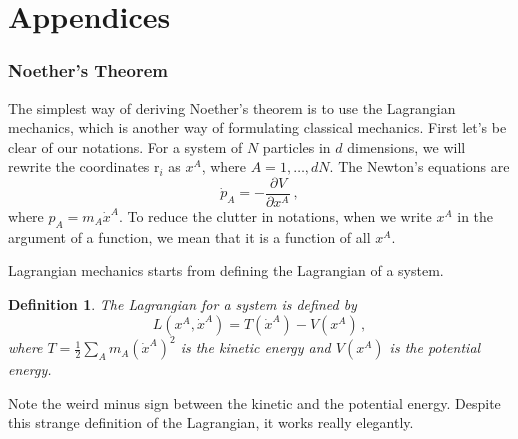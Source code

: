 \documentclass{article}
\theoremstyle{plain}\theoremheaderfont{\normalfont\itshape}\theorembodyfont{\rmfamily}\theoremseparator{.}\newtheorem*{rem}{Remark}\newtheorem*{ex}{Example}\newtheorem*{proof}{Proof}\newtheorem*{altp}{Alternative proof}
\theoremstyle{plain}\theoremheaderfont{\normalfont\bfseries}\theorembodyfont{\rmfamily}\theoremseparator{.}\newtheorem{thm}{Theorem}[section]\newtheorem{lem}[thm]{Lemma}\newtheorem{prop}[thm]{Proposition}\newtheorem*{cor}{Corollary}\newtheorem{defn}[thm]{Definition}\newtheorem{clm}[thm]{Claim}\newtheorem{clminproof}{Claim}\newtheorem{alg}[thm]{Algorithm}\newtheorem{hyp}[thm]{Hypothesis}\newtheorem{law}[thm]{Law}
\theoremstyle{break}\theoremheaderfont{\normalfont\itshape}\theorembodyfont{\rmfamily}\theoremseparator{.\medskip}\newtheorem*{proofskip}{Proof}\newtheorem*{exs}{Examples}\newtheorem*{rems}{Remarks}
\theoremstyle{break}\theoremheaderfont{\normalfont\bfseries}\theorembodyfont{\rmfamily}\theoremseparator{.\medskip}\newtheorem{lemskip}[thm]{Lemma}\newtheorem{defnskip}[thm]{Definition}\newtheorem{propskip}[thm]{Proposition}\newtheorem{thmskip}[thm]{Theorem}
\numberwithin{equation}{section}
\newcommand{\pdv}[3][]{\frac{\partial^{#1} #2}{{\partial #3}^{#1}}}
\newcommand{\vb}[1]{\bm{\mathrm{#1}}}
\begin{document}
    \newpage
    \part*{Appendices}
    \appendix

    \section{Noether's Theorem}\label{Appendix:Noether}
    The simplest way of deriving Noether's theorem is to use the Lagrangian mechanics, which is another way of formulating classical mechanics. First let's be clear of our notations. For a system of \(N\) particles in \(d\) dimensions, we will rewrite the coordinates \(\vb{r}_i\) as \(x^A\), where \(A=1,\dots,dN\). The Newton's equations are
    \begin{equation}\label{Newtons_eqn}
        \dot{p}_A=-\pdv{V}{x^A}\,,
    \end{equation}
    where \(p_A=m_A\dot{x}^A\). To reduce the clutter in notations, when we write \(x^A\) in the argument of a function, we mean that it is a function of all \(x^A\).
    
    Lagrangian mechanics starts from defining the Lagrangian of a system.
    \begin{defn}
        The \textit{Lagrangian} for a system is defined by
        \begin{equation}
            L(x^A,\dot{x}^A)=T(\dot{x}^A)-V(x^A)\,,
        \end{equation}
        where \(T=\frac{1}{2}\sum_{A}m_A(\dot{x}^A)^2\) is the kinetic energy and \(V(x^A)\) is the potential energy.
    \end{defn}
    Note the weird minus sign between the kinetic and the potential energy. Despite this strange definition of the Lagrangian, it works really elegantly.
\end{document}
